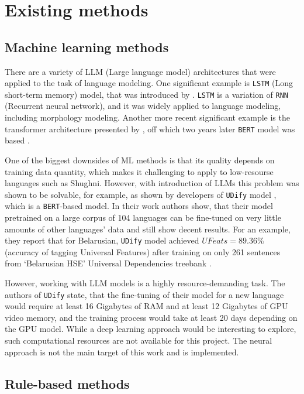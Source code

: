 \section{Existing methods}

\subsection{Machine learning methods} \label{dl_methods}
There are a variety of LLM (Large language model) architectures that were applied to the task of language modeling. One significant example is \texttt{LSTM} (Long short-term memory) model, that was introduced by \textcite{lstm_1997}. \texttt{LSTM} is a variation of \texttt{RNN} (Recurrent neural network), and it was widely applied to language modeling, including morphology modeling. Another more recent significant example is the transformer architecture presented by \textcite{transformer_2017}, off which two years later \texttt{BERT} model was based \parencite{devlin_2019}. 

One of the biggest downsides of ML methods is that its quality depends on training data quantity, which makes it challenging to apply to low-resourse languages such as Shughni. However, with introduction of LLMs this problem was shown to be solvable, for example, as shown by developers of \texttt{UDify} model \parencite{kondratyuk_straka_model_2019}, which is a \texttt{BERT}-based model. In their work authors show, that their model pretrained on a large corpus of 104 languages can be fine-tuned on very little amounts of other languages' data and still show decent results. For an example, they report that for Belarusian, \texttt{UDify} model achieved $UFeats=89.36\%$ (accuracy of tagging Universal Features) after training on only 261 sentences from `Belarusian HSE' Universal Dependencies treebank \parencite[Table 7]{kondratyuk_straka_model_2019}.

However, working with LLM models is a highly resource-demanding task. The authors of \texttt{UDify} state, that the fine-tuning of their model for a new language would require at least 16 Gigabytes of RAM and at least 12 Gigabytes of GPU video memory, and the training process would take at least 20 days depending on the GPU model. While a deep learning approach would be interesting to explore, such computational resources are not available for this project. The neural approach is not the main target of this work and is implemented. 

\subsection{Rule-based methods}
